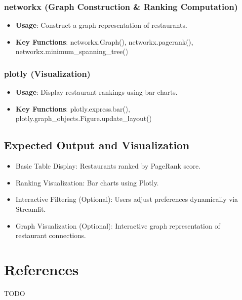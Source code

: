 \documentclass[fontsize=11pt]{article}
\begin{document}
\subsubsection*{networkx (Graph Construction \& Ranking Computation)}
\begin{itemize}
    \item \textbf{Usage}: Construct a graph representation of restaurants.
    \item \textbf{Key Functions}: networkx.Graph(), networkx.pagerank(), networkx.minimum\_spanning\_tree()
\end{itemize}

\subsubsection*{plotly (Visualization)}
\begin{itemize}
    \item \textbf{Usage}: Display restaurant rankings using bar charts.
    \item \textbf{Key Functions}: plotly.express.bar(), plotly.graph\_objects.Figure.update\_layout()
\end{itemize}

\subsection*{Expected Output and Visualization}
\begin{itemize}
    \item Basic Table Display: Restaurants ranked by PageRank score.
    \item Ranking Visualization: Bar charts using Plotly.
    \item Interactive Filtering (Optional): Users adjust preferences dynamically via Streamlit.
    \item Graph Visualization (Optional): Interactive graph representation of restaurant connections.
\end{itemize}

\section*{References}

TODO
\end{document}

